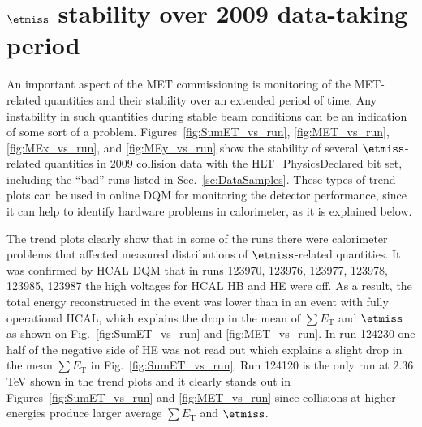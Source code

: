 \section{$\etmiss$ stability over 2009 data-taking period}
\label{sc:METStab}

An important aspect of the MET commissioning is monitoring of the
MET-related quantities and their stability over an extended period of
time. Any instability in such quantities during stable beam conditions
can be an indication of some sort of a problem.
Figures~\ref{fig:SumET_vs_run}, \ref{fig:MET_vs_run},
\ref{fig:MEx_vs_run}, and \ref{fig:MEy_vs_run} show the stability of
several $\etmiss$-related quantities in 2009 collision data with the
HLT\_PhysicsDeclared bit set, including the ``bad'' runs listed in
Sec.~\ref{sc:DataSamples}. These types of trend plots can be used in online DQM
for monitoring the detector performance, since it can help to identify
hardware problems in calorimeter, as it is explained below.

The trend plots clearly show that in some of the runs there
were calorimeter problems that affected measured distributions 
of $\etmiss$-related quantities. It was
confirmed by HCAL DQM that in runs 123970, 123976, 123977,
123978, 123985, 123987 the high voltages for HCAL HB and HE were off. As
a result, the total energy reconstructed in the event was lower than in
an event with fully operational HCAL, which explains the drop in
the mean of $\sum E_\text{T}$ and $\etmiss$ as shown on
Fig.~\ref{fig:SumET_vs_run} and \ref{fig:MET_vs_run}. 
In run 124230 one half of the negative side of HE was not read out which
explains a slight drop in the mean $\sum E_\text{T}$ in Fig.~\ref{fig:SumET_vs_run}.
Run 124120 is the only run at $2.36$ TeV shown in the trend plots and it clearly stands out in
Figures~\ref{fig:SumET_vs_run} and \ref{fig:MET_vs_run} since collisions at higher energies
produce larger average $\sum E_\text{T}$ and $\etmiss$.

